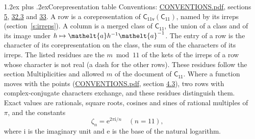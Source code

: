 \documentclass[10pt,a4paper]{article}
\makeatletter
\renewcommand\section{\@startsection{section}{1}{\z@}{-3ex plus -1ex minus -.2ex}%
  {1.2ex plus .2ex}{\normalfont\large\sffamily\bfseries\color{parttitle}}}
\numberwithin{equation}{section}
\newcommand{\eltfont}[1]{{\let\sigma\eltsigma\mathelt{#1}}}
\newcommand{\grp}[1]{\mathsf{#1}}
\newcommand{\elt}[1]{\eltfont{#1}}
\newcommand{\iunit}{\mathrm{i}}
\newcommand{\expe}{\mathrm{e}}
\newcommand{\rootunity}[1]{\zeta_{#1}}
\makeatother
\begin{document}
\section{Corepresentation table}\label{s:character_table}
Conventions: \href{../../CONVENTIONS.pdf}{CONVENTIONS.pdf}, sections \href{../../../rotation/CONVENTIONS.pdf\#conv.5}{5}, \href{../../CONVENTIONS.pdf\#conv.32.3}{32.3} and \href{../../CONVENTIONS.pdf\#conv.33}{33}.
A row is a corepresentation of $\grp{C_{11v}}(\grp{C_{11}})$, named by its irreps (section~\ref{s:irreps}). A column is a merged class of $\grp{C_{11}}$, the union of a class and of its image under $h \mapsto \elt{a} h^{-1} \elt{a}^{-1}$. The entry of a row is the character of its corepresentation on the class, the sum of the characters of its irreps.
\leavevmode\label{n:head.parity}The listed residues are the $m \bmod 11$ of the kets of the irreps of a row whose character is not real (a dash for the other rows). These residues follow the section Multiplicities and allowed $m$ of the document of \href{../../../rotation/data/pdf/C11.pdf}{$\grp{C_{11}}$}. Where a function moves with the points (\href{../../CONVENTIONS.pdf}{CONVENTIONS.pdf}, section \href{../../../rotation/CONVENTIONS.pdf\#conv.4.3}{4.3}), two rows with complex-conjugate characters exchange, and these residues distinguish them.
\leavevmode\label{n:constant.root}\label{n:index.root.order}Exact values are rationals, square roots, cosines and sines of rational multiples of $\pi$, and the constants
\begin{equation}\label{e:constants}\rootunity{n} = \expe^{2\pi\iunit/n}\quad(n = 11),\end{equation}
where $\iunit$ is the imaginary unit and $\expe$ is the base of the natural logarithm.
\end{document}
